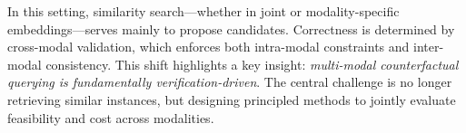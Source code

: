 In this setting, similarity search—whether in joint or modality-specific embeddings—serves mainly to propose candidates. Correctness is determined by cross-modal validation, which enforces both intra-modal constraints and inter-modal consistency. This shift highlights a key insight: \emph{multi-modal counterfactual querying is fundamentally verification-driven}. The central challenge is no longer retrieving similar instances, but designing principled methods to jointly evaluate feasibility and cost across modalities.